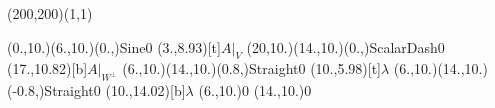 \unitlength=1bp%

\begin{feynartspicture}(200,200)(1,1)

\FADiagram{}
\FAProp(0.,10.)(6.,10.)(0.,){Sine}{0}
\FALabel(3.,8.93)[t]{$A|_V$}
\FAProp(20,10.)(14.,10.)(0.,){ScalarDash}{0}
\FALabel(17.,10.82)[b]{$A|_{W^\perp}$}
\FAProp(6.,10.)(14.,10.)(0.8,){Straight}{0}
\FALabel(10.,5.98)[t]{$\lambda$}
\FAProp(6.,10.)(14.,10.)(-0.8,){Straight}{0}
\FALabel(10.,14.02)[b]{$\lambda$}
\FAVert(6.,10.){0}
\FAVert(14.,10.){0}
\end{feynartspicture}

